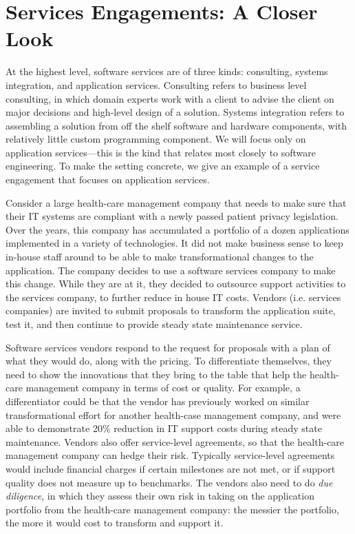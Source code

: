\section{Services Engagements: A Closer Look}

At the highest level, software services are of three kinds: consulting, systems integration, and application services. Consulting refers to business level consulting, in which domain experts work with a client to advise the client on major decisions and high-level design of a solution.  Systems integration refers to assembling a solution from off the shelf software and hardware components, with relatively little custom programming component.  We will focus only on application services---this is the kind that relates most closely to software engineering.  To make the setting concrete, we give an example of a service engagement that focuses on application services. 

Consider a large health-care management company that needs to make sure that their IT systems are compliant with a newly passed patient privacy legislation. Over the years, this company has accumulated a portfolio of a dozen applications implemented in a variety of technologies. It did not make business sense to keep in-house staff around to be able to make transformational changes to the application. The company decides to use a software services company to make this change. While they are at it, they decided to outsource support activities to the services company, to further reduce in house IT costs.  Vendors (i.e. services companies) are invited to submit proposals to transform the application suite, test it, and then continue to provide steady state maintenance service.

Software services vendors respond to the request for proposals with a plan of what they would do, along with the pricing. To differentiate themselves, they need to show the innovations that they bring to the table that help the health-care management company in terms of cost or quality. For example, a differentiator could be that the vendor has previously worked on similar transformational effort for another health-case management company, and were able to demonstrate 20\% reduction in IT support costs during steady state maintenance. Vendors also offer service-level agreements, so that the health-care management company can hedge their risk.  Typically service-level agreements would include financial charges if certain milestones are not met, or if support quality does not measure up to benchmarks. The vendors also need to do \textit{due diligence}, in which they assess their own risk in taking on the application portfolio from the health-care management company: the messier the portfolio, the more it would cost to transform and support it.


